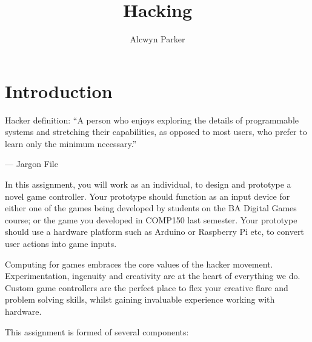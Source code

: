 \documentclass{../fal_assignment}
\title{Hacking }
\author{Alcwyn Parker}
\begin{document}
\maketitle

\section*{Introduction}

\begin{marginquote}
Hacker definition: ``A person who enjoys exploring the details of programmable systems and stretching their capabilities, as opposed to most users, who prefer to learn only the minimum necessary.''

--- Jargon File

\end{marginquote}

In this assignment, you will work as an individual, to design and prototype a novel game controller. Your prototype should function as an input device for either one of the games being developed by students on the BA Digital Games course; or the game you developed in COMP150 last semester. Your prototype should use a hardware platform such as Arduino or Raspberry Pi etc, to convert user actions into game inputs. 

Computing for games embraces the core values of the hacker movement.  Experimentation, ingenuity and creativity are at the heart of everything we do. Custom game controllers are the perfect place to flex your creative flare and problem solving skills, whilst gaining invaluable experience working with hardware. 

This assignment is formed of several components:
\end{document}
